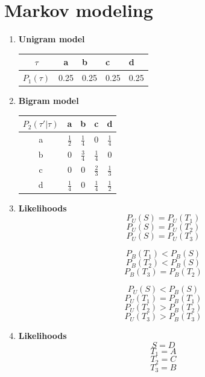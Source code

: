 \documentclass[11]{article}
\begin{document}
\section{Markov modeling}
\begin{enumerate}[label=(\alph*)]
\item{\textbf{Unigram model}}
\begin{table}[htp]
\centering
\begin{tabular}{|c|c|l|l|l|}
\hline
$\tau$      & a    & b    & c    & d    \\ \hline
$P_1(\tau)$ & 0.25 & 0.25 & 0.25 & 0.25 \\ \hline
\end{tabular}
\end{table}

\item{\textbf{Bigram model}}
\begin{table}[htp]
\centering
\begin{tabular}{|c|c|c|c|c|}
\hline
$P_2(\tau'|\tau)$ & a             & b             & c             & d             \\ \hline
a                 & $\frac{1}{2}$ & $\frac{1}{4}$ & 0             & $\frac{1}{4}$ \\ \hline
b                 & 0             & $\frac{3}{4}$ & $\frac{1}{4}$ & 0             \\ \hline
c                 & 0             & 0             & $\frac{2}{3}$ & $\frac{1}{3}$ \\ \hline
d                 & $\frac{1}{4}$ & 0             & $\frac{1}{4}$ & $\frac{1}{2}$ \\ \hline
\end{tabular}
\end{table}

\item{\textbf{Likelihoods}}
$$P_U(S)=P_U(T_1)$$
$$P_U(S)=P_U(T_2)$$
$$P_U(S)=P_U(T_3)$$

$$P_B(T_1)<P_B(S)$$
$$P_B(T_2)<P_B(S)$$
$$P_B(T_3)=P_B(T_2)$$

$$P_U(S)<P_B(S)$$
$$P_U(T_1)=P_B(T_1)$$
$$P_U(T_2)>P_B(T_2)$$
$$P_U(T_3)>P_B(T_3)$$

\item{\textbf{Likelihoods}}
$$S=D$$
$$T_1=A$$
$$T_2=C$$
$$T_3=B$$

\end{enumerate}
\end{document}
